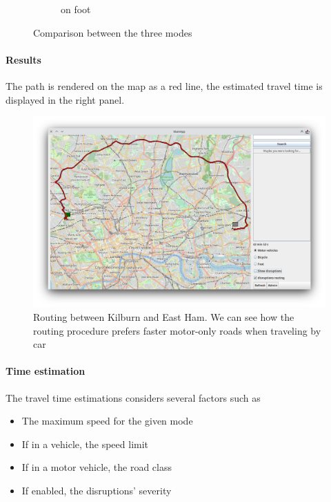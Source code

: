 \begin{figure}[H]
\begin{subfigure}[b]{0.3\textwidth}
		\caption{on foot}
	\end{subfigure}
	\caption{Comparison between the three modes}
	\label{fig:routingsdiff}
\end{figure}

\paragraph{Results}
The path is rendered on the map as a red line, the estimated travel time is 
displayed in the right panel.

\begin{figure}[H]
	\centering
	\includegraphics[width=\linewidth]{assets/mainapp3.png}
	\caption[]{
		Routing between Kilburn and East Ham.
		We can see how the routing procedure prefers faster motor-only roads 
		when traveling by car
	}
	\label{fig:mainappdialog3}
\end{figure}

\paragraph{Time estimation}
The travel time estimations considers several factors such as

\begin{itemize}
	\item The maximum speed for the given mode
	\item If in a vehicle, the speed limit
	\item If in a motor vehicle, the road class
	\item If enabled, the disruptions' severity
\end{itemize}

